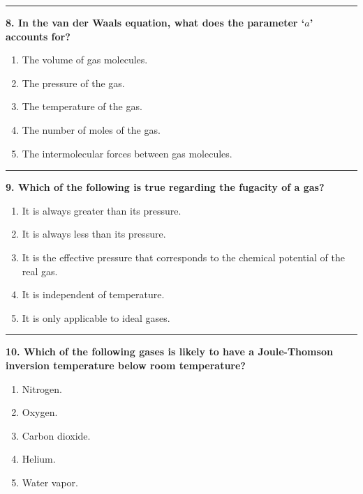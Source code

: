 \documentclass[
  9pt,
]{extbook}
\providecommand{\tightlist}{%
  \setlength{\itemsep}{0pt}\setlength{\parskip}{0pt}}
\theoremstyle{definition}
\theoremstyle{definition}
\theoremstyle{definition}
\theoremstyle{remark}
\begin{document}
\begin{center}\rule{0.5\linewidth}{0.5pt}\end{center}

\textbf{8. In the van der Waals equation, what does the parameter `\(a\)' accounts for?}

\begin{enumerate}
\def\labelenumi{\alph{enumi}.}
\tightlist
\item
  The volume of gas molecules.
\item
  The pressure of the gas.
\item
  The temperature of the gas.
\item
  The number of moles of the gas.
\item
  The intermolecular forces between gas molecules.
\end{enumerate}

\begin{center}\rule{0.5\linewidth}{0.5pt}\end{center}

\textbf{9. Which of the following is true regarding the fugacity of a gas?}

\begin{enumerate}
\def\labelenumi{\alph{enumi}.}
\tightlist
\item
  It is always greater than its pressure.
\item
  It is always less than its pressure.
\item
  It is the effective pressure that corresponds to the chemical potential of the real gas.
\item
  It is independent of temperature.
\item
  It is only applicable to ideal gases.
\end{enumerate}

\begin{center}\rule{0.5\linewidth}{0.5pt}\end{center}

\textbf{10. Which of the following gases is likely to have a Joule-Thomson inversion temperature below room temperature?}

\begin{enumerate}
\def\labelenumi{\alph{enumi}.}
\tightlist
\item
  Nitrogen.
\item
  Oxygen.
\item
  Carbon dioxide.
\item
  Helium.
\item
  Water vapor.
\end{enumerate}
\end{document}
